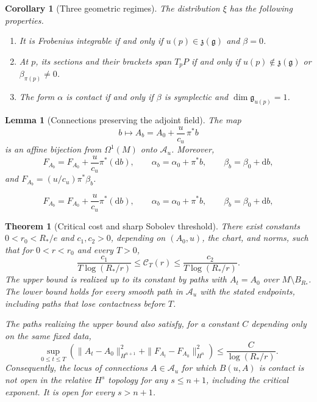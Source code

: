 \documentclass[10pt,a4paper]{amsart}
\newtheorem{theorem}{Theorem}
\newtheorem{corollary}{Corollary}
\newtheorem{lemma}{Lemma}
\newcommand{\D}{\xi}
\newcommand{\dd}{\mathrm d}
\newcommand{\g}{\mathfrak g}
\newcommand{\z}{\mathfrak z}
\begin{document}
\begin{corollary}[Three geometric regimes]\label{cor:regimes}
The distribution $\D$ has the following properties.
\begin{enumerate}
\item It is Frobenius integrable if and only if $u(p)\in\z(\g)$ and
      $\beta=0$.
\item At $p$, its sections and their brackets span $T_pP$ if and only if
      $u(p)\notin\z(\g)$ or $\beta_{\pi(p)}\ne0$.
\item The form $\alpha$ is contact if and only if $\beta$ is symplectic and
      $\dim\g_{u(p)}=1$.
\end{enumerate}
\end{corollary}

\begin{lemma}[Connections preserving the adjoint field]\label{lem:scalar-source}
The map
\begin{equation}\label{eq:scalar-source}
 b\longmapsto A_b=A_0+\frac{u}{c_u}\,\pi^*b
\end{equation}
is an affine bijection from $\Omega^1(M)$ onto $\mathcal A_u$. Moreover,
\begin{equation}\label{eq:scalar-source-curvature}
 F_{A_b}=F_{A_0}+\frac{u}{c_u}\pi^*(\dd b),\qquad
 \alpha_b=\alpha_0+\pi^*b,\qquad
 \beta_b=\beta_0+\dd b,
\end{equation}
and $F_{A_b}=(u/c_u)\pi^*\beta_b$.
\end{lemma}

\begin{equation}
 F_{A_b}=F_{A_0}+\frac{u}{c_u}\pi^*(\dd b),\qquad
 \alpha_b=\alpha_0+\pi^*b,\qquad
 \beta_b=\beta_0+\dd b,
\end{equation}

\begin{theorem}[Critical cost and sharp Sobolev threshold]\label{thm:critical}
There exist constants $0<r_0<R_*/e$ and $c_1,c_2>0$, depending on $(A_0,u)$, the chart,
and norms, such that for $0<r<r_0$ and every $T>0$,
\begin{equation}\label{eq:critical-two-sided}
 \frac{c_1}{T\log(R_*/r)}\leq\mathcal C_T(r)
       \leq\frac{c_2}{T\log(R_*/r)}.
\end{equation}
The upper bound is realized up to its constant by paths with $A_t=A_0$
over $M\setminus B_{R_*}$.
The lower bound holds for every smooth path in $\mathcal A_u$ with
the stated endpoints, including paths that lose contactness before $T$.

The paths realizing the upper bound also satisfy, for a constant $C$
depending only on the same fixed data,
\begin{equation}\label{eq:critical-uniform}
 \sup_{0\leq t\leq T}
 \left(\|A_t-A_0\|_{H^{n+1}}^2+
       \|F_{A_t}-F_{A_0}\|_{H^n}^2\right)
       \leq\frac{C}{\log(R_*/r)}.
\end{equation}
Consequently, the locus of connections $A\in\mathcal A_u$ for which
$B(u,A)$ is contact is not open in the relative $H^s$ topology for any
$s\leq n+1$, including the critical exponent. It is open for every
$s>n+1$.
\end{theorem}
\end{document}
